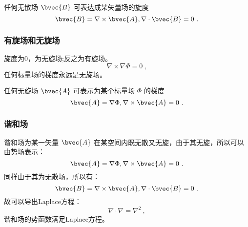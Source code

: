 任何无散场 $\bvec{B}$ 可表达成某矢量场的旋度
\begin{equation}\label{eq_VecAnl_25}
\bvec{B}=\nabla\times\bvec{A} ,\nabla\cdot\bvec{B}=0~.
\end{equation}

\subsubsection{有旋场和无旋场}
旋度为0，为无旋场;反之为有旋场。
\begin{equation}\label{eq_VecAnl_26}
\nabla\times\nabla\Phi=0~,
\end{equation}
任何标量场的梯度永远是无旋场。

任何无旋场 $\bvec{A}$ 可表示为某个标量场 $\Phi$ 的梯度
\begin{equation}\label{eq_VecAnl_27}
\bvec{A}=\nabla\Phi,\nabla\times\bvec{A}=0~.
\end{equation}

\subsubsection{谐和场}
谐和场为某一矢量 $\bvec{A}$ 在某空间内既无散又无旋，由于其无旋，所以可以由势场表示：
\begin{equation}\label{eq_VecAnl_28}
\bvec{A}=\nabla\Phi,\nabla\times\bvec{A}=0~.
\end{equation}
同样由于其为无散场，所以有：
\begin{equation}\label{eq_VecAnl_29}
\bvec{B}=\nabla\times\bvec{A} ,\nabla\cdot\bvec{B}=0~.
\end{equation}
故可以导出Laplace方程：
\begin{equation}\label{eq_VecAnl_30}
\nabla\cdot\nabla=\nabla^2~,
\end{equation}
谐和场的势函数满足Laplace方程。
